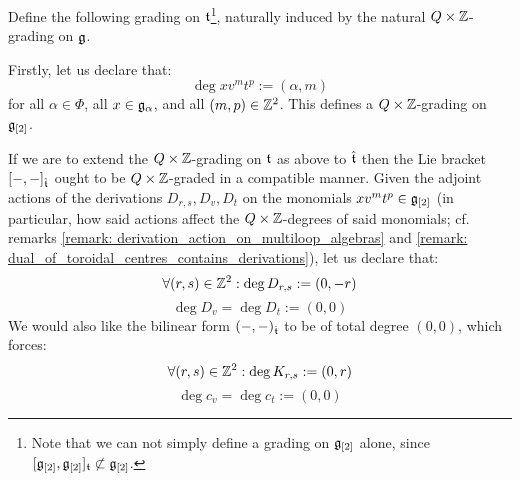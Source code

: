         \begin{proposition} \label{prop: root_grading_on_extended_toroidal_lie_algebras}
            Define the following grading on $\mathfrak{t}$\footnote{Note that we can not simply define a grading on $\mathfrak{g}_{[2]}$ alone, since $[\mathfrak{g}_{[2]}, \mathfrak{g}_{[2]}]_{\mathfrak{t}} \not \subset \mathfrak{g}_{[2]}$.}, naturally induced by the natural $Q \x \Z$-grading on $\mathfrak{g}$.
            
            Firstly, let us declare that:
                $$\deg x v^m t^p := (\alpha, m)$$
            for all $\alpha \in \Phi$, all $x \in \mathfrak{g}_{\alpha}$, and all $(m, p) \in \mathbb{Z}^2$. This defines a $Q \x \Z$-grading on $\mathfrak{g}_{[2]}$. 
            
            If we are to extend the $Q \x \Z$-grading on $\mathfrak{t}$ as above to $\hat{\mathfrak{t}}$ then the Lie bracket $[-, -]_{\hat{\mathfrak{t}}}$ ought to be $Q \x \Z$-graded in a compatible manner. Given the adjoint actions of the derivations $D_{r, s}, D_v, D_t$ on the monomials $x v^m t^p \in \mathfrak{g}_{[2]}$ (in particular, how said actions affect the $Q \x \Z$-degrees of said monomials; cf. remarks \ref{remark: derivation_action_on_multiloop_algebras} and \ref{remark: dual_of_toroidal_centres_contains_derivations}), let us declare that:
                $$\forall (r, s) \in \mathbb{Z}^2: \deg D_{r, s} := (0, -r)$$
                $$\deg D_v = \deg D_t := (0, 0)$$
            We would also like the bilinear form $(-, -)_{\hat{\mathfrak{t}}}$ to be of total degree $(0, 0)$, which forces:
                $$\forall (r, s) \in \mathbb{Z}^2: \deg K_{r, s} := (0, r)$$
                $$\deg c_v = \deg c_t := (0, 0)$$
        \end{proposition}
